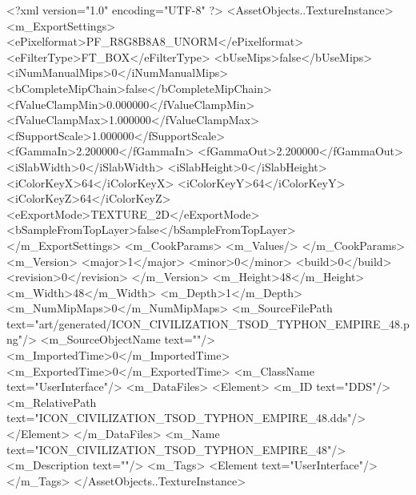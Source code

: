 <?xml version="1.0" encoding="UTF-8" ?>
<AssetObjects..TextureInstance>
	<m_ExportSettings>
		<ePixelformat>PF_R8G8B8A8_UNORM</ePixelformat>
		<eFilterType>FT_BOX</eFilterType>
		<bUseMips>false</bUseMips>
		<iNumManualMips>0</iNumManualMips>
		<bCompleteMipChain>false</bCompleteMipChain>
		<fValueClampMin>0.000000</fValueClampMin>
		<fValueClampMax>1.000000</fValueClampMax>
		<fSupportScale>1.000000</fSupportScale>
		<fGammaIn>2.200000</fGammaIn>
		<fGammaOut>2.200000</fGammaOut>
		<iSlabWidth>0</iSlabWidth>
		<iSlabHeight>0</iSlabHeight>
		<iColorKeyX>64</iColorKeyX>
		<iColorKeyY>64</iColorKeyY>
		<iColorKeyZ>64</iColorKeyZ>
		<eExportMode>TEXTURE_2D</eExportMode>
		<bSampleFromTopLayer>false</bSampleFromTopLayer>
	</m_ExportSettings>
	<m_CookParams>
		<m_Values/>
	</m_CookParams>
	<m_Version>
		<major>1</major>
		<minor>0</minor>
		<build>0</build>
		<revision>0</revision>
	</m_Version>
	<m_Height>48</m_Height>
	<m_Width>48</m_Width>
	<m_Depth>1</m_Depth>
	<m_NumMipMaps>0</m_NumMipMaps>
	<m_SourceFilePath text="art/generated/ICON_CIVILIZATION_TSOD_TYPHON_EMPIRE_48.png"/>
	<m_SourceObjectName text=""/>
	<m_ImportedTime>0</m_ImportedTime>
	<m_ExportedTime>0</m_ExportedTime>
	<m_ClassName text="UserInterface"/>
	<m_DataFiles>
		<Element>
			<m_ID text="DDS"/>
			<m_RelativePath text="ICON_CIVILIZATION_TSOD_TYPHON_EMPIRE_48.dds"/>
		</Element>
	</m_DataFiles>
	<m_Name text="ICON_CIVILIZATION_TSOD_TYPHON_EMPIRE_48"/>
	<m_Description text=""/>
	<m_Tags>
		<Element text="UserInterface"/>
	</m_Tags>
</AssetObjects..TextureInstance>

